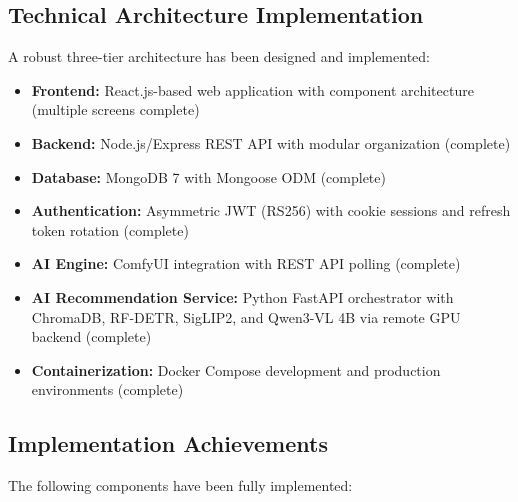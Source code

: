 \subsection{Technical Architecture Implementation}

A robust three-tier architecture has been designed and implemented:
\begin{itemize}
    \item \textbf{Frontend:} React.js-based web application with component architecture (multiple screens complete)
    \item \textbf{Backend:} Node.js/Express REST API with modular organization (complete)
    \item \textbf{Database:} MongoDB 7 with Mongoose ODM (complete)
    \item \textbf{Authentication:} Asymmetric JWT (RS256) with cookie sessions and refresh token rotation (complete)
    \item \textbf{AI Engine:} ComfyUI integration with REST API polling (complete)
    \item \textbf{AI Recommendation Service:} Python FastAPI orchestrator with ChromaDB, RF-DETR, SigLIP2, and Qwen3-VL 4B via remote GPU backend (complete)
    \item \textbf{Containerization:} Docker Compose development and production environments (complete)
\end{itemize}

\subsection{Implementation Achievements}

The following components have been fully implemented:

